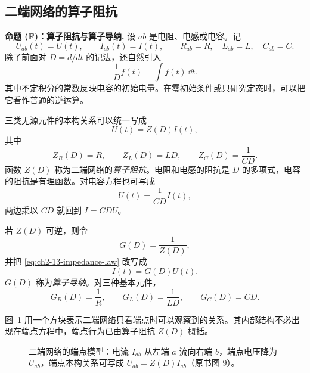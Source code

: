 \subsection*{二端网络的算子阻抗}

\medskip
\noindent\textbf{命题 (F)：算子阻抗与算子导纳.}
设 \(ab\) 是电阻、电感或电容。记
\begin{equation}
 U_{ab}(t)=U(t),
 \qquad
 I_{ab}(t)=I(t),
 \qquad
 R_{ab}=R,\quad L_{ab}=L,\quad C_{ab}=C.
 \label{eq:ch2-13-generic-element-data}
\end{equation}
除了前面对 \(D=d/dt\) 的记法，还自然引入
\begin{equation}
 \frac1D f(t)=\int f(t)\,\dd t.
 \label{eq:ch2-13-inverse-D}
\end{equation}
其中不定积分的常数反映电容的初始电量。在零初始条件或只研究定态时，可以把它看作普通的逆运算。

三类无源元件的本构关系可以统一写成
\begin{equation}
 U(t)=Z(D)I(t),
 \label{eq:ch2-13-impedance-law}
\end{equation}
其中
\begin{equation}
 Z_R(D)=R,
 \qquad
 Z_L(D)=LD,
 \qquad
 Z_C(D)=\frac1{CD}.
 \label{eq:ch2-13-element-impedances}
\end{equation}
函数 \(Z(D)\) 称为二端网络的\emph{算子阻抗}。电阻和电感的阻抗是 \(D\) 的多项式，电容的阻抗是有理函数。对电容方程也可写成
\begin{equation}
 U(t)=\frac1{CD}I(t),
 \label{eq:ch2-13-capacitor-impedance}
 \end{equation}
两边乘以 \(CD\) 就回到 \(I=C DU\)。

若 \(Z(D)\) 可逆，则令
\begin{equation}
 G(D)=\frac1{Z(D)},
 \label{eq:ch2-13-admittance-definition}
\end{equation}
并把 \eqref{eq:ch2-13-impedance-law} 改写成
\begin{equation}
 I(t)=G(D)U(t).
 \label{eq:ch2-13-admittance-law}
\end{equation}
\(G(D)\) 称为\emph{算子导纳}。对三种基本元件，
\[
 G_R(D)=\frac1R,
 \qquad
 G_L(D)=\frac1{LD},
 \qquad
 G_C(D)=CD.
\]

图~\ref{fig:ch2-13-terminal-impedance} 用一个方块表示二端网络只看端点时可以观察到的关系。其内部结构不必出现在端点方程中，端点行为已由算子阻抗 \(Z(D)\) 概括。

\begin{figure}[H]
 \centering
 \resizebox{0.62\textwidth}{!}{}
 \caption{二端网络的端点模型：电流 \(I_{ab}\) 从左端 \(a\) 流向右端 \(b\)，端点电压降为 \(U_{ab}\)，端点本构关系可写成 \(U_{ab}=Z(D)I_{ab}\)（原书图 9）。}
 \label{fig:ch2-13-terminal-impedance}
\end{figure}


